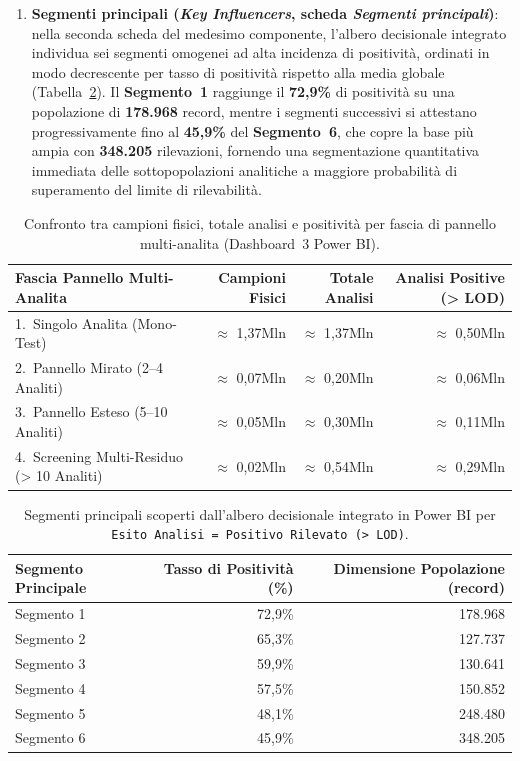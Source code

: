 \begin{enumerate}
    \item \textbf{Segmenti principali (\textit{Key Influencers}, scheda \textit{Segmenti principali})}: nella seconda scheda del medesimo componente, l'albero decisionale integrato individua sei segmenti omogenei ad alta incidenza di positività, ordinati in modo decrescente per tasso di positività rispetto alla media globale (Tabella~\ref{tab:powerbi_segments}). Il \textbf{Segmento~1} raggiunge il \textbf{72,9\%} di positività su una popolazione di \textbf{178.968} record, mentre i segmenti successivi si attestano progressivamente fino al \textbf{45,9\%} del \textbf{Segmento~6}, che copre la base più ampia con \textbf{348.205} rilevazioni, fornendo una segmentazione quantitativa immediata delle sottopopolazioni analitiche a maggiore probabilità di superamento del limite di rilevabilità.
\end{enumerate}

\begin{table}[htbp]
\centering
\caption{Confronto tra campioni fisici, totale analisi e positività per fascia di pannello multi-analita (Dashboard~3 Power BI).}
\label{tab:powerbi_multiresidue}
\begin{tabularx}{\textwidth}{@{}Xrrr@{}}
\toprule
\textbf{Fascia Pannello Multi-Analita} & \textbf{Campioni Fisici} & \textbf{Totale Analisi} & \textbf{Analisi Positive (\textgreater{} LOD)} \\
\midrule
1.\ Singolo Analita (Mono-Test) & $\approx$ 1,37Mln & $\approx$ 1,37Mln & $\approx$ 0,50Mln \\
2.\ Pannello Mirato (2--4 Analiti) & $\approx$ 0,07Mln & $\approx$ 0,20Mln & $\approx$ 0,06Mln \\
3.\ Pannello Esteso (5--10 Analiti) & $\approx$ 0,05Mln & $\approx$ 0,30Mln & $\approx$ 0,11Mln \\
4.\ Screening Multi-Residuo (\textgreater{} 10 Analiti) & $\approx$ 0,02Mln & $\approx$ 0,54Mln & $\approx$ 0,29Mln \\
\bottomrule
\end{tabularx}
\end{table}

\begin{table}[htbp]
\centering
\caption{Segmenti principali scoperti dall'albero decisionale integrato in Power BI per \texttt{Esito Analisi = Positivo Rilevato (\textgreater{} LOD)}.}
\label{tab:powerbi_segments}
\begin{tabularx}{\textwidth}{@{}Xrr@{}}
\toprule
\textbf{Segmento Principale} & \textbf{Tasso di Positività (\%)} & \textbf{Dimensione Popolazione (record)} \\
\midrule
Segmento 1 & 72,9\% & 178.968 \\
Segmento 2 & 65,3\% & 127.737 \\
Segmento 3 & 59,9\% & 130.641 \\
Segmento 4 & 57,5\% & 150.852 \\
Segmento 5 & 48,1\% & 248.480 \\
Segmento 6 & 45,9\% & 348.205 \\
\bottomrule
\end{tabularx}
\end{table}

